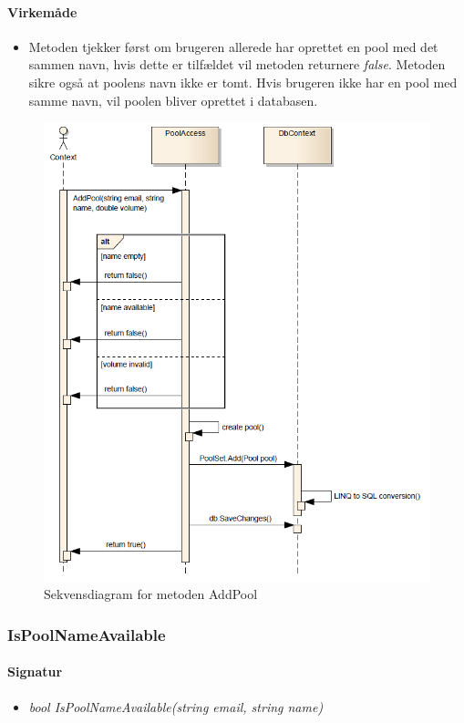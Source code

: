 \paragraph{Virkemåde}
\begin{itemize}
	\item Metoden tjekker først om brugeren allerede har oprettet en pool med det sammen navn, hvis dette er tilfældet vil metoden returnere \textit{false}. Metoden sikre også at poolens navn ikke er tomt. Hvis brugeren ikke har en pool med samme navn, vil poolen bliver oprettet i databasen.
\end{itemize}

\begin{figure}
\centering
\includegraphics[width=0.7\linewidth]{figs/dbSeq/addPool}
\caption{Sekvensdiagram for metoden AddPool}
\label{fig:addPool}
\end{figure}





\subsubsection{IsPoolNameAvailable}%






\paragraph{Signatur}
\begin{itemize}
	\item \textit{bool IsPoolNameAvailable(string email, string name)}
\end{itemize}

